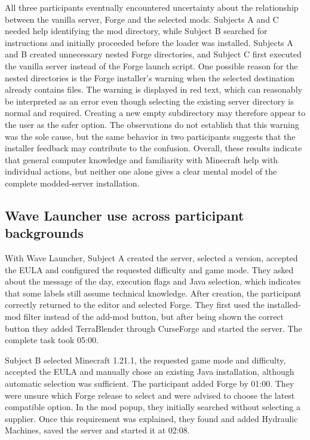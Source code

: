 All three participants eventually encountered uncertainty about the relationship between the vanilla server, Forge and the selected mods. Subjects A and C needed help identifying the mod directory, while Subject B searched for instructions and initially proceeded before the loader was installed. Subjects A and B created unnecessary nested Forge directories, and Subject C first executed the vanilla server instead of the Forge launch script. One possible reason for the nested directories is the Forge installer's warning when the selected destination already contains files. The warning is displayed in red text, which can reasonably be interpreted as an error even though selecting the existing server directory is normal and required. Creating a new empty subdirectory may therefore appear to the user as the safer option. The observations do not establish that this warning was the sole cause, but the same behavior in two participants suggests that the installer feedback may contribute to the confusion. Overall, these results indicate that general computer knowledge and familiarity with Minecraft help with individual actions, but neither one alone gives a clear mental model of the complete modded-server installation.

\subsection{Wave Launcher use across participant backgrounds}

With Wave Launcher, Subject A created the server, selected a version, accepted the EULA and configured the requested difficulty and game mode. They asked about the message of the day, execution flags and Java selection, which indicates that some labels still assume technical knowledge. After creation, the participant correctly returned to the editor and selected Forge. They first used the installed-mod filter instead of the add-mod button, but after being shown the correct button they added TerraBlender through CurseForge and started the server. The complete task took 05:00.

Subject B selected Minecraft 1.21.1, the requested game mode and difficulty, accepted the EULA and manually chose an existing Java installation, although automatic selection was sufficient. The participant added Forge by 01:00. They were unsure which Forge release to select and were advised to choose the latest compatible option. In the mod popup, they initially searched without selecting a supplier. Once this requirement was explained, they found and added Hydraulic Machines, saved the server and started it at 02:08.

